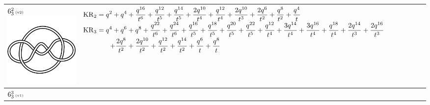 \documentclass{compositio}
\theoremstyle{definition}
\numberwithin{equation}{section}
\begin{document}
{\begin{longtable}{p{}|p{}}
$6_{3}^2\,\text{{\tiny (v2)}}$ 
\includegraphics[scale=0.07,angle=0]{link6_3_2.pdf} 
& 
$
\displaystyle{%
\KR_{2} = q^2+q^4+\frac{q^{16}}{t^6}+\frac{q^{12}}{t^5}+\frac{q^{14}}{t^5}+\frac{2 q^{10}}{t^4}+\frac{q^{12}}{t^4}+\frac{2 q^{10}}{t^3}+\frac{2 q^6}{t^2}+\frac{q^8}{t^2}+\frac{q^4}{t}
}
$
\newline 
$
\displaystyle{%
\KR_{3} = q^4+q^6+q^8+\frac{q^{22}}{t^6}+\frac{q^{24}}{t^6}+\frac{q^{16}}{t^5}+\frac{q^{18}}{t^5}+\frac{q^{20}}{t^5}+\frac{q^{22}}{t^5}+\frac{q^{12}}{t^4}+\frac{3 q^{14}}{t^4}+\frac{3 q^{16}}{t^4}+\frac{q^{18}}{t^4}+\frac{2 q^{14}}{t^3}+\frac{2 q^{16}}{t^3}
}
$
\newline
$
\displaystyle{%
\qquad\qquad +\frac{2 q^8}{t^2}+\frac{2 q^{10}}{t^2}+\frac{q^{12}}{t^2}+\frac{q^{14}}{t^2}+\frac{q^6}{t}+\frac{q^8}{t}
}
$
\\
\hline
$6_{3}^3\,\text{{\tiny (v1)}}$

\end{longtable}}
\end{document}
